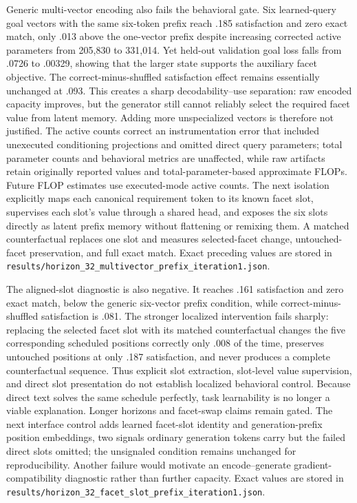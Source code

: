 \documentclass[11pt]{article}
\begin{document}
Generic multi-vector encoding also fails the behavioral gate. Six learned-query goal vectors with the same six-token prefix reach .185 satisfaction and zero exact match, only .013 above the one-vector prefix despite increasing corrected active parameters from 205,830 to 331,014. Yet held-out validation goal loss falls from .0726 to .00329, showing that the larger state supports the auxiliary facet objective. The correct-minus-shuffled satisfaction effect remains essentially unchanged at .093. This creates a sharp decodability--use separation: raw encoded capacity improves, but the generator still cannot reliably select the required facet value from latent memory. Adding more unspecialized vectors is therefore not justified. The active counts correct an instrumentation error that included unexecuted conditioning projections and omitted direct query parameters; total parameter counts and behavioral metrics are unaffected, while raw artifacts retain originally reported values and total-parameter-based approximate FLOPs. Future FLOP estimates use executed-mode active counts. The next isolation explicitly maps each canonical requirement token to its known facet slot, supervises each slot's value through a shared head, and exposes the six slots directly as latent prefix memory without flattening or remixing them. A matched counterfactual replaces one slot and measures selected-facet change, untouched-facet preservation, and full exact match. Exact preceding values are stored in \texttt{results/horizon\_32\_multivector\_prefix\_iteration1.json}.

The aligned-slot diagnostic is also negative. It reaches .161 satisfaction and zero exact match, below the generic six-vector prefix condition, while correct-minus-shuffled satisfaction is .081. The stronger localized intervention fails sharply: replacing the selected facet slot with its matched counterfactual changes the five corresponding scheduled positions correctly only .008 of the time, preserves untouched positions at only .187 satisfaction, and never produces a complete counterfactual sequence. Thus explicit slot extraction, slot-level value supervision, and direct slot presentation do not establish localized behavioral control. Because direct text solves the same schedule perfectly, task learnability is no longer a viable explanation. Longer horizons and facet-swap claims remain gated. The next interface control adds learned facet-slot identity and generation-prefix position embeddings, two signals ordinary generation tokens carry but the failed direct slots omitted; the unsignaled condition remains unchanged for reproducibility. Another failure would motivate an encode--generate gradient-compatibility diagnostic rather than further capacity. Exact values are stored in \texttt{results/horizon\_32\_facet\_slot\_prefix\_iteration1.json}.
\end{document}
